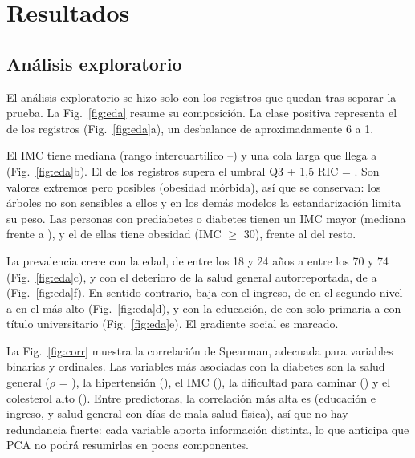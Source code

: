 \documentclass[journal]{IEEEtran}
\begin{document}
\section{Resultados}\label{sec:resultados}

\subsection{Análisis exploratorio}
El análisis exploratorio se hizo solo con los \nEda{} registros que quedan tras separar la prueba. La Fig.~\ref{fig:eda} resume su composición. La clase positiva representa el \prevalenciaEda{} de los registros (Fig.~\ref{fig:eda}a), un desbalance de aproximadamente 6 a 1.

El IMC tiene mediana \imcMediana{} (rango intercuartílico \imcQuno--\imcQtres) y una cola larga que llega a \imcMax{} (Fig.~\ref{fig:eda}b). El \imcPctAtipicos{} de los registros supera el umbral Q3 + 1,5 RIC = \imcLimite. Son valores extremos pero posibles (obesidad mórbida), así que se conservan: los árboles no son sensibles a ellos y en los demás modelos la estandarización limita su peso. Las personas con prediabetes o diabetes tienen un IMC mayor (mediana \imcMedianaCon{} frente a \imcMedianaSin), y el \imcObesCon{} de ellas tiene obesidad (IMC $\geq$ 30), frente al \imcObesSin{} del resto.

La prevalencia crece con la edad, de \edadMin{} entre los 18 y 24 años a \edadMax{} entre los 70 y 74 (Fig.~\ref{fig:eda}c), y con el deterioro de la salud general autorreportada, de \saludUno{} a \saludCinco{} (Fig.~\ref{fig:eda}f). En sentido contrario, baja con el ingreso, de \ingresoDos{} en el segundo nivel a \ingresoOcho{} en el más alto (Fig.~\ref{fig:eda}d), y con la educación, de \eduDos{} con solo primaria a \eduSeis{} con título universitario (Fig.~\ref{fig:eda}e). El gradiente social es marcado.

La Fig.~\ref{fig:corr} muestra la correlación de Spearman, adecuada para variables binarias y ordinales. Las variables más asociadas con la diabetes son la salud general ($\rho$ = \rhoSalud), la hipertensión (\rhoHiper), el IMC (\rhoImc), la dificultad para caminar (\rhoCaminar) y el colesterol alto (\rhoCol). Entre predictoras, la correlación más alta es \maxCorrPred{} (educación e ingreso, y salud general con días de mala salud física), así que no hay redundancia fuerte: cada variable aporta información distinta, lo que anticipa que PCA no podrá resumirlas en pocas componentes.
\end{document}
